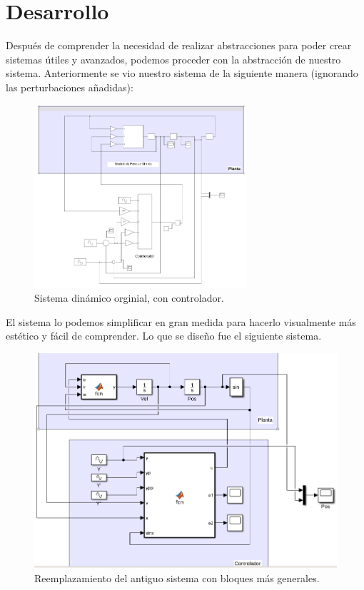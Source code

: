 \documentclass[12pt, letterpaper]{article}
\begin{document}
\section*{Desarrollo}

Después de comprender la necesidad de realizar abstracciones para poder crear sistemas útiles y avanzados, podemos proceder con la abstracción de nuestro sistema. Anteriormente se vio nuestro sistema de la siguiente manera (ignorando las perturbaciones añadidas):

\begin{figure}[H]
	\centering
	\includegraphics[width=0.7\textwidth]{system.png}
	\caption{Sistema dinámico orginial, con controlador.}
\end{figure}

El sistema lo podemos simplificar en gran medida para hacerlo visualmente más estético y fácil de comprender. Lo que se diseño fue el siguiente sistema.

\begin{figure}[H]
	\centering
	\includegraphics[width=\textwidth]{newsys.png}
	\caption{Reemplazamiento del antiguo sistema con bloques más generales.}
\end{figure}
\end{document}
